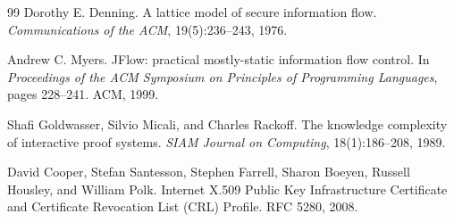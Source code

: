 \documentclass[11pt]{article}
\theoremstyle{definition}
\theoremstyle{plain}
\theoremstyle{remark}
\begin{document}
\begin{thebibliography}{99}
Dorothy E. Denning.
\newblock A lattice model of secure information flow.
\newblock \textit{Communications of the ACM}, 19(5):236--243, 1976.

Andrew C. Myers.
\newblock JFlow: practical mostly-static information flow control.
\newblock In \textit{Proceedings of the ACM Symposium on Principles of Programming Languages}, pages 228--241. ACM, 1999.

Shafi Goldwasser, Silvio Micali, and Charles Rackoff.
\newblock The knowledge complexity of interactive proof systems.
\newblock \textit{SIAM Journal on Computing}, 18(1):186--208, 1989.

David Cooper, Stefan Santesson, Stephen Farrell, Sharon Boeyen, Russell Housley, and William Polk.
\newblock Internet X.509 Public Key Infrastructure Certificate and Certificate Revocation List (CRL) Profile.
\newblock RFC 5280, 2008.

\end{thebibliography}
\end{document}

